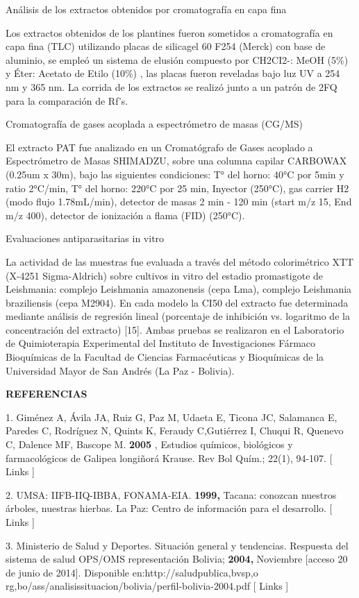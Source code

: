 \documentclass{article}
\begin{document}
Análisis de los extractos obtenidos por cromatografía en capa fina

Los extractos obtenidos de los plantines fueron sometidos a cromatografía en
capa fina (TLC) utilizando placas de silicagel 60 F254 (Merck) con base de
aluminio, se empleó un sistema de elusión compuesto por CH2CI2-: MeOH (5\%) y
Éter: Acetato de Etilo (10\%) , las placas fueron reveladas bajo luz UV a 254 nm
y 365 nm. La corrida de los extractos se realizó junto a un patrón de 2FQ para
la comparación de Rf's.

Cromatografía de gases acoplada a espectrómetro de masas (CG/MS)

El extracto PAT fue analizado en un Cromatógrafo de Gases acoplado a
Espectrómetro de Masas SHIMADZU, sobre una columna capilar CARBOWAX (0.25um x
30m), bajo las siguientes condiciones: T° del horno: 40°C por 5min y ratio
2°C/min, T° del horno: 220°C por 25 min, Inyector (250°C), gas carrier H2 (modo
flujo 1.78mL/min), detector de masas 2 min - 120 min (start m/z 15, End m/z
400), detector de ionización a flama (FID) (250°C).

Evaluaciones antiparasitarias in vitro

La actividad de las muestras fue evaluada a través del método colorimétrico XTT
(X-4251 Sigma-Aldrich) sobre cultivos in vitro del estadio promastigote de
Leishmania: complejo Leishmania amazonensis (cepa Lma), complejo Leishmania
braziliensis (cepa M2904). En cada modelo la CI50 del extracto fue determinada
mediante análisis de regresión lineal (porcentaje de inhibición vs. logaritmo de
la concentración del extracto) [15]. Ambas pruebas se realizaron en el
Laboratorio de Quimioterapia Experimental del Instituto de Investigaciones
Fármaco Bioquímicas de la Facultad de Ciencias Farmacéuticas y Bioquímicas de la
Universidad Mayor de San Andrés (La Paz - Bolivia).

\textbf{REFERENCIAS}

1. Giménez A, Ávila JA, Ruiz G, Paz M, Udaeta E, Ticona JC, Salamanca E, Paredes
C, Rodríguez N, Quints K, Feraudy C,Gutiérrez I, Chuqui R, Quenevo C, Dalence
MF, Bascope M. \textbf{2005}
, Estudios químicos, biológicos y farmacológicos de Galipea longiñorá Krause.
Rev Bol Quím.; 22(1), 94-107. [ Links ]

2. UMSA: IIFB-IIQ-IBBA, FONAMA-EIA. \textbf{1999, }
Tacana: conozcan nuestros árboles, nuestras hierbas. La Paz: Centro de
información para el desarrollo. [ Links ]

3. Ministerio de Salud y Deportes. Situación general y tendencias. Respuesta del
sistema de salud OPS/OMS representación Bolivia; \textbf{2004, }
Noviembre [acceso 20 de junio de 2014]. Disponible en:http://saludpublica,bvsp,o
rg,bo/ass/analisissituacion/bolivia/perfil-bolivia-2004.pdf [ Links ]
\end{document}
